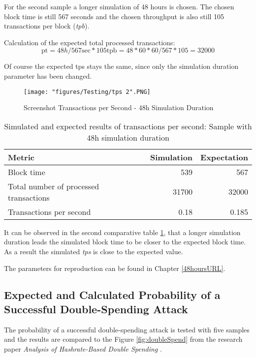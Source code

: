 For the second sample a longer simulation of 48 hours is chosen. The chosen block time is still 567 seconds and the chosen throughput is also still 105 transactions per block (\textit{tpb}).

Calculation of the expected total processed transactions:
\begin{equation}
\text{pt} = 48h / 567 \text{sec} * 105 \text{tpb} = 48*60*60/567 * 105 = 32000
\end{equation}

Of course the expected tps stays the same, since only the simulation duration parameter has been changed.

\begin{figure}[!htb]
\centering
\texttt{[image: "figures/Testing/tps 2".PNG]}
\caption{Screenshot Transactions per Second - 48h Simulation Duration\label{fig:tpsSimulation48h}}
\end{figure}

\begin{table}[ht]
    \caption{Simulated and expected results of transactions per second: Sample with 48h simulation duration\label{table:tps48hsimulation}}
\centering
\begin{adjustbox}{width=0.8\textwidth}
    \begin{tabular}{| l | r | r |}
    \hline
    \textbf{Metric} & \textbf{Simulation} & \textbf{Expectation}\\ \hline
    Block time & 539 & 567\\ \hline
    Total number of processed transactions & 
31700 & 32000 \\ \hline
    Transactions per second & 0.18 & 0.185\\ \hline
    \end{tabular}
\end{adjustbox}
\end{table} 

It can be observed in the second comparative table \ref{table:tps48hsimulation}, that a longer simulation duration leads the simulated block time to be closer to the expected block time. As a result the simulated \textit{tps} is close to the expected value.

The parameters for reproduction can be found in Chapter \ref{48hoursURL}.

\subsection{Expected and Calculated Probability of a Successful Double-Spending Attack}
\label{subsection:evalCalcDoubleSpending}
The probability of a successful double-spending attack is tested with five samples and the results are compared to the Figure \ref{fig:doubleSpend} from the research paper \textit{Analysis of Hashrate-Based Double Spending} \cite{doublespending}.

